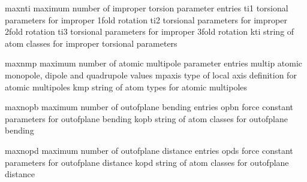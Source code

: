 \documentclass[letterpaper,11pt,english]{sphinxmanual}
\begin{document}
\sphinxAtStartPar
{}

\begin{sphinxVerbatim}[commandchars=\\\{\}]
maxnti          maximum number of improper torsion parameter entries
ti1             torsional parameters for improper 1\PYGZhy{}fold rotation
ti2             torsional parameters for improper 2\PYGZhy{}fold rotation
ti3             torsional parameters for improper 3\PYGZhy{}fold rotation
kti             string of atom classes for improper torsional parameters
\end{sphinxVerbatim}

\sphinxAtStartPar
{}

\begin{sphinxVerbatim}[commandchars=\\\{\}]
maxnmp          maximum number of atomic multipole parameter entries
multip          atomic monopole, dipole and quadrupole values
mpaxis          type of local axis definition for atomic multipoles
kmp             string of atom types for atomic multipoles
\end{sphinxVerbatim}

\sphinxAtStartPar
{}

\begin{sphinxVerbatim}[commandchars=\\\{\}]
maxnopb         maximum number of out\PYGZhy{}of\PYGZhy{}plane bending entries
opbn            force constant parameters for out\PYGZhy{}of\PYGZhy{}plane bending
kopb            string of atom classes for out\PYGZhy{}of\PYGZhy{}plane bending
\end{sphinxVerbatim}

\sphinxAtStartPar
{}

\begin{sphinxVerbatim}[commandchars=\\\{\}]
maxnopd         maximum number of out\PYGZhy{}of\PYGZhy{}plane distance entries
opds            force constant parameters for out\PYGZhy{}of\PYGZhy{}plane distance
kopd            string of atom classes for out\PYGZhy{}of\PYGZhy{}plane distance
\end{sphinxVerbatim}
\end{document}
